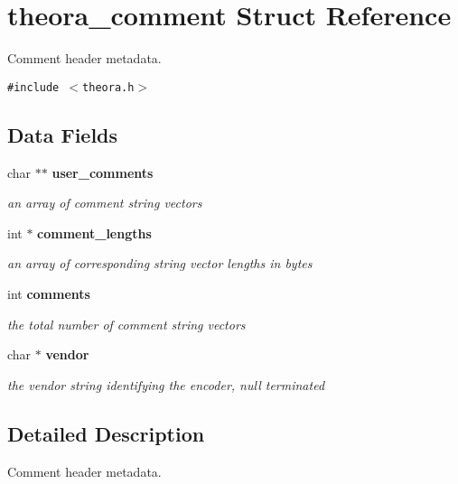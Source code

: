 \section{theora\_\-comment Struct Reference}
\label{structtheora__comment}
Comment header metadata.  


{\tt \#include $<$theora.h$>$}

\subsection*{Data Fields}
\begin{CompactItemize}
\item 
char $\ast$$\ast$ {\bf user\_\-comments}\label{structtheora__comment_o0}

\begin{CompactList}\small\item\em an array of comment string vectors \item\end{CompactList}\item 
int $\ast$ {\bf comment\_\-lengths}\label{structtheora__comment_o1}

\begin{CompactList}\small\item\em an array of corresponding string vector lengths in bytes \item\end{CompactList}\item 
int {\bf comments}\label{structtheora__comment_o2}

\begin{CompactList}\small\item\em the total number of comment string vectors \item\end{CompactList}\item 
char $\ast$ {\bf vendor}\label{structtheora__comment_o3}

\begin{CompactList}\small\item\em the vendor string identifying the encoder, null terminated \item\end{CompactList}\end{CompactItemize}


\subsection{Detailed Description}
Comment header metadata. 

